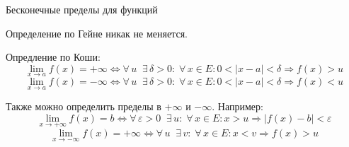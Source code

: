 \begin{conj}
    Бесконечные пределы для функций
\end{conj}
Определение по Гейне никак не меняется. 

Опредление по Коши:
\[ \lim_{x \to a} f(x) = +\infty \Longleftrightarrow \forall \, u \;\; \exists \, \delta > 0 : \; \forall \, x \in E : 0 < |x - a| < \delta \Rightarrow f(x) > u \]
\[ \lim_{x \to a} f(x) = -\infty \Longleftrightarrow \forall \, u \;\; \exists \, \delta > 0 : \; \forall \, x \in E : 0 < |x - a| < \delta \Rightarrow f(x) < u \]

\begin{notice}
    Также можно определить пределы в $+\infty$ и $-\infty$. Например:
    \[ \lim_{x \to +\infty} f(x) = b \Longleftrightarrow \forall \, \varepsilon > 0 \;\; \exists \, u : \; \forall \, x \in E : x > u \Rightarrow |f(x) - b| < \varepsilon   \]
    \[ \lim_{x \to -\infty} f(x) = +\infty \Longleftrightarrow \forall \, u \;\; \exists \, v : \; \forall \, x \in E : x < v \Rightarrow f(x) > u \]
\end{notice}